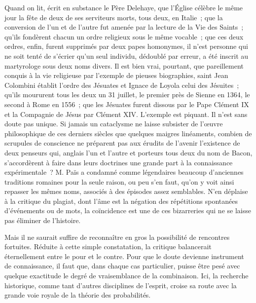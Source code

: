 \documentclass[french,twoside]{book} %
\newcommand{\astermono}{\medskip\centerline{\color{rubric}\large\selectfont{\syms ✻}}\medskip\par}%
\begin{document}
\noindent Quand on lit, écrit en substance le Père Delehaye, que l’Église célèbre le même jour la fête de deux de ses serviteurs morts, tous deux, en Italie ; que la conversion de l’un et de l’autre fut amenée par la lecture de la Vie des Saints ; qu’ils fondèrent chacun un ordre religieux sous le même vocable ; que ces deux ordres, enfin, furent supprimés par deux papes homonymes, il n’est personne qui ne soit tenté de s’écrier qu’un seul individu, dédoublé par erreur, a été inscrit au martyrologe sous deux noms divers. Il est bien vrai, pourtant, que pareillement conquis à la vie religieuse par l’exemple de pieuses biographies, saint Jean Colombini établit l’ordre des Jésuates et Ignace de Loyola celui des Jésuites ; qu’ils moururent tous les deux un 31 juillet, le premier près de Sienne en 1364, le second à Rome en 1556 ; que les Jésuates furent dissous par le Pape Clément IX et la Compagnie de Jésus par Clément XIV. L’exemple est piquant. Il n’est sans doute pas unique. Si jamais un cataclysme ne laisse subsister de l’œuvre philosophique de ces derniers siècles que quelques maigres linéaments, combien de scrupules de conscience ne préparent pas aux érudits de l’avenir l’existence de deux penseurs qui, anglais l’un et l’autre et porteurs tous deux du nom de Bacon, s’accordèrent à faire dans leurs doctrines une grande part à la connaissance expérimentale ? M. Païs a condamné comme légendaires beaucoup d’anciennes traditions romaines pour la seule raison, ou peu s’en faut, qu’on y voit ainsi repasser les mêmes noms, associés à des épisodes assez semblables. N’en déplaise à la critique du plagiat, dont l’âme est la négation des répétitions spon­tanées d’événements ou de mots, la coïncidence est une de ces bizarreries qui ne se laisse pas éliminer de l’histoire.\par
\label{p60} Mais il ne saurait suffire de reconnaître en gros la possibilité de ren­contres fortuites. Réduite à cette simple constatation, la critique balan­cerait éternellement entre le pour et le contre. Pour que le doute devienne instrument de connaissance, il faut que, dans chaque cas particulier, puisse être pesé avec quelque exactitude le degré de vraisemblance de la combinaison. Ici, la recherche historique, comme tant d’autres dis­ciplines de l’esprit, croise sa route avec la grande voie royale de la théorie des probabilités.\par

\astermono
\end{document}
